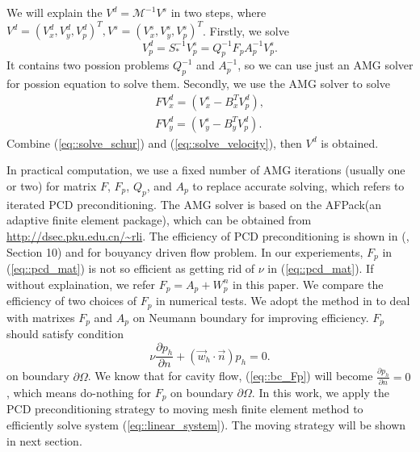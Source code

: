 \documentclass{eajam}
\begin{document}
  We will explain the $V^d = \mathcal{M}^{-1} V^s$ in two steps,
  where $V^d = (V_x^d, V_y^d, V_p^d)^T, V^s = (V_x^s, V_y^s, V_p^s)^T$.
  Firstly, we solve 
  \begin{equation}
    V_p^d = S_*^{-1} V_p^s = Q_p^{-1} F_p A_p^{-1} V_p^s.
    \label{eq::solve_schur}
  \end{equation}
  It contains two possion problems $Q_p^{-1}$ and $A_p^{-1}$, so we can
  use just an AMG solver for possion equation to solve them.
  Secondly, we use the AMG solver to solve 
  \begin{equation}
    \begin{aligned}
      F V_x^d = (V_x^s - B_x^T V_p^d), \\
      F V_y^d = (V_y^s - B_y^T V_p^d).
    \end{aligned}
    \label{eq::solve_velocity}
  \end{equation}
  Combine (\ref{eq::solve_schur}) and (\ref{eq::solve_velocity}), then
  $V^d$ is obtained.

  In practical computation, we use a fixed number of AMG iterations
  (usually one or two) for matrix $F$, $F_p$, $Q_p$, and $A_p$ to
  replace accurate solving, which refers to iterated PCD
  preconditioning. The AMG solver is based on the AFPack(an adaptive
  finite element package), which can be
  obtained from \url{http://dsec.pku.edu.cn/~rli}. The efficiency of
  PCD preconditioning is shown in (\cite{elman2005finite},
  Section 10) and \cite{elman2011fast} for bouyancy driven flow
  problem. In our experiements, $F_p$ in (\ref{eq::pcd_mat}) is not so
  efficient as getting rid of $\nu$ in (\ref{eq::pcd_mat}). If without
  explaination, we refer $F_p = A_p + W_p^n$ in this paper. We compare
  the efficiency of two choices of $F_p$ in numerical tests. We
  adopt the method in \cite{elman2009boundary} to deal with matrixes
  $F_p$ and $A_p$ on Neumann boundary for improving efficiency. $F_p$
  should satisfy condition
  \begin{equation}
    \nu \frac{\partial p_h}{\partial n} + (\vec{w}_h \cdot \vec{n})
    p_h = 0.
    \label{eq::bc_Fp}
  \end{equation}
  on boundary $\partial \Omega$. We know that for cavity flow,
  (\ref{eq::bc_Fp}) will become $\frac{\partial p_h}{\partial n} =
  0$, which means do-nothing for $F_p$ on boundary $\partial \Omega$. 
  In this work, we apply the PCD preconditioning strategy to moving mesh
  finite element method to efficiently solve system
  (\ref{eq::linear_system}). The moving strategy will be shown in next
  section.
 
\end{document}
